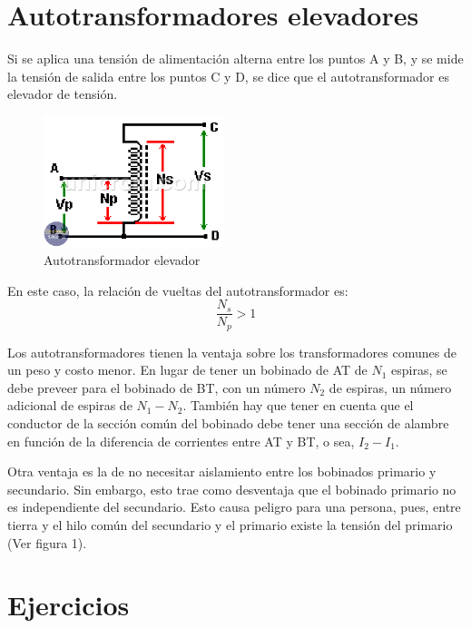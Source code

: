 \documentclass[11pt]{report}
\begin{document}
\section{Autotransformadores elevadores}
Si se aplica una tensión de alimentación alterna entre los puntos A y B, y se mide la tensión de salida entre los puntos C y D, se dice que el autotransformador es elevador de tensión.

\begin{figure}[h]
    \begin{center}
        \includegraphics[width=200px]{autotransformador-elevador.png}
    \end{center}
    \caption{Autotransformador elevador}
\end{figure}

En este caso, la relación de vueltas del autotransformador es: 
\begin{equation}
    \frac{N_s}{N_p} > 1
\end{equation}

Los autotransformadores tienen la ventaja sobre los transformadores comunes 
de un peso y costo menor. En lugar de tener un bobinado de AT de $N_1$ espiras,
se debe preveer para el bobinado de BT, con un número $N_2$ de espiras, un número 
adicional de espiras de $N_1-N_2$. También hay que tener en cuenta que el conductor
de la sección común del bobinado debe tener una sección de alambre en función de la 
diferencia de corrientes entre AT y BT, o sea, $I_2-I_1$.

Otra ventaja es la de no necesitar aislamiento entre los bobinados primario y secundario.
Sin embargo, esto trae como desventaja que el bobinado primario no es independiente del 
secundario. Esto causa peligro para una persona, pues, entre tierra y el hilo común del 
secundario y el primario existe la tensión del primario (Ver figura 1).

\section{Ejercicios}
\end{document}
